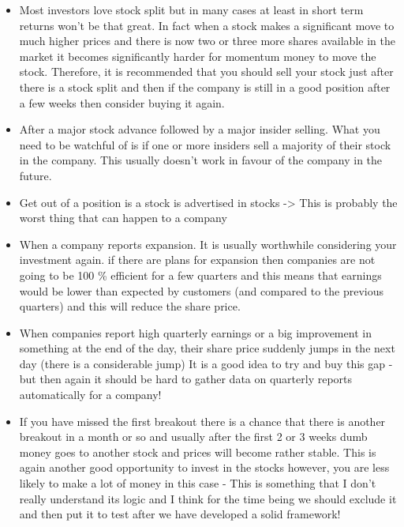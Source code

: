 \documentclass[12 pt]{article}
\begin{document}
\begin{itemize}
\item Most investors love stock split  but in many cases at least in short term returns won’t be that great. In fact when a stock makes a significant move to much higher prices and there is now two or three more shares available in the market it becomes significantly harder for momentum money to move the stock. Therefore, it is recommended that you should sell your stock just after there is a stock split and then if the company is still in a good position after a few weeks then consider buying it again. 

\item After a major stock advance followed by a major insider selling. What you need to be watchful of is if one or more insiders sell a majority of their stock in the company. This usually doesn't work in favour of the company in the future. 
\item Get out of a position is a stock is advertised in stocks -> This is probably the worst thing that can happen to a company

\item When a company reports expansion. It is usually worthwhile considering your investment again. if there are plans for expansion then companies are not going to be 100 \% efficient for a few quarters and this means that earnings would be lower than expected by customers (and compared to the previous quarters) and this will reduce the share price.

\item  When companies report high quarterly earnings or a big improvement in something at the end of the day, their share price suddenly jumps in the next day (there is a considerable jump) It is a good idea to try and buy this gap - but then again it should be hard to gather data on quarterly reports automatically for a company!

\item If you have missed the first breakout there is a chance that there is another breakout in a month or so and usually after the first 2 or 3 weeks dumb money goes to another stock and prices will become rather stable. This is again another good opportunity to invest in the stocks however, you are less likely to make a lot of money in this case - This is something that I don’t really understand its logic and I think for the time being we should exclude it and then put it to test after we have developed a solid framework! 
\end{itemize}
\end{document}
